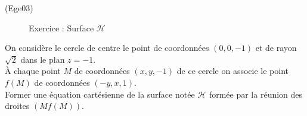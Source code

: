 \begin{tiny}(Ege03)\end{tiny}
\begin{figure}[ht]
	\centering
	
	\caption{Exercice : Surface $\mathcal H$}
	\label{fig:Ege03_1}
\end{figure}
On consid{\`e}re le cercle de centre le point de coordonn{\'e}es $(0,0,-1)$ et de rayon $\sqrt{2}$ dans le plan $z=-1$.\\
{\`A} chaque point $M$ de coordonn{\'e}es $(x,y,-1)$ de ce cercle on associe le point $f(M)$ de coordonn{\'e}es $(-y,x,1)$.\\
Former une {\'e}quation cart{\'e}sienne de la surface notée $\mathcal{H}$ form{\'e}e par la r{\'e}union des droites $(Mf(M))$.